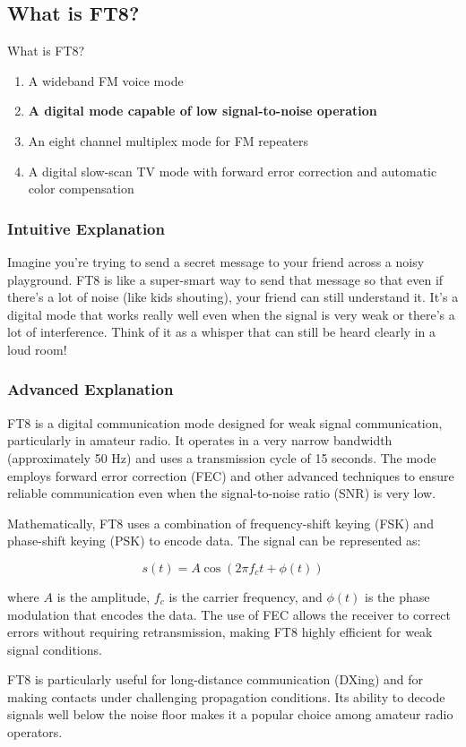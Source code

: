 \subsection{What is FT8?}
\label{T8D13}

\begin{tcolorbox}[colback=gray!10!white,colframe=black!75!black,title=T8D13]
What is FT8?
\begin{enumerate}[label=\Alph*)]
    \item A wideband FM voice mode
    \item \textbf{A digital mode capable of low signal-to-noise operation}
    \item An eight channel multiplex mode for FM repeaters
    \item A digital slow-scan TV mode with forward error correction and automatic color compensation
\end{enumerate}
\end{tcolorbox}

\subsubsection{Intuitive Explanation}
Imagine you're trying to send a secret message to your friend across a noisy playground. FT8 is like a super-smart way to send that message so that even if there's a lot of noise (like kids shouting), your friend can still understand it. It's a digital mode that works really well even when the signal is very weak or there's a lot of interference. Think of it as a whisper that can still be heard clearly in a loud room!

\subsubsection{Advanced Explanation}
FT8 is a digital communication mode designed for weak signal communication, particularly in amateur radio. It operates in a very narrow bandwidth (approximately 50 Hz) and uses a transmission cycle of 15 seconds. The mode employs forward error correction (FEC) and other advanced techniques to ensure reliable communication even when the signal-to-noise ratio (SNR) is very low. 

Mathematically, FT8 uses a combination of frequency-shift keying (FSK) and phase-shift keying (PSK) to encode data. The signal can be represented as:

\[ s(t) = A \cos(2\pi f_c t + \phi(t)) \]

where \( A \) is the amplitude, \( f_c \) is the carrier frequency, and \( \phi(t) \) is the phase modulation that encodes the data. The use of FEC allows the receiver to correct errors without requiring retransmission, making FT8 highly efficient for weak signal conditions.

FT8 is particularly useful for long-distance communication (DXing) and for making contacts under challenging propagation conditions. Its ability to decode signals well below the noise floor makes it a popular choice among amateur radio operators.

